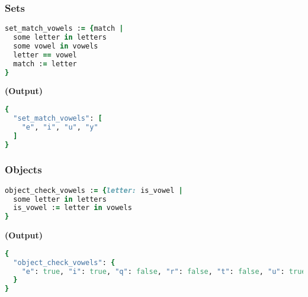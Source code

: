 \documentclass[twocolumn]{article}
\begin{document}
\subsubsection*{Sets}

\begin{lstlisting}[language=Ruby]
set_match_vowels := {match |
  some letter in letters
  some vowel in vowels
  letter == vowel
  match := letter
}
\end{lstlisting}



\textbf{\tiny{(Output)}}
\begin{lstlisting}[language=Ruby]
{
  "set_match_vowels": [
    "e", "i", "u", "y"
  ]
}

\end{lstlisting}



\vspace{-1em}
\subsubsection*{Objects}

\begin{lstlisting}[language=Ruby]
object_check_vowels := {letter: is_vowel |
  some letter in letters
  is_vowel := letter in vowels
}
\end{lstlisting}



\textbf{\tiny{(Output)}}
\begin{lstlisting}[language=Ruby]
{
  "object_check_vowels": {
    "e": true, "i": true, "q": false, "r": false, "t": false, "u": true, "w": false, "y": true
  }
}

\end{lstlisting}
\end{document}
